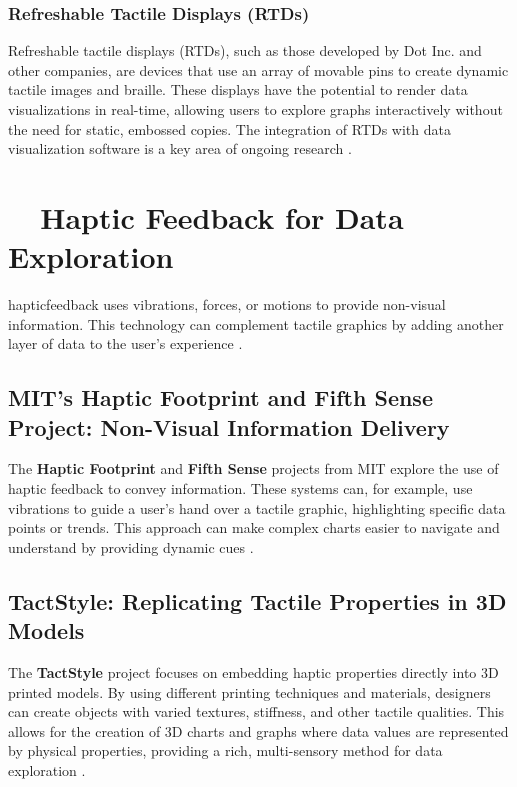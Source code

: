 \subsubsection{Refreshable Tactile Displays (RTDs)}\label{ch13:sssec:rtds}
Refreshable tactile displays (RTDs), such as those developed by Dot Inc. and other companies, are devices that use an array of movable pins to create dynamic tactile images and braille. These displays have the potential to render data visualizations in real-time, allowing users to explore graphs interactively without the need for static, embossed copies. The integration of RTDs with data visualization software is a key area of ongoing research \supercite{DotInc, OrbitGraphiti}.

\section{~~Haptic Feedback for Data Exploration}\label{ch13:sec:haptic-feedback}
\gls{hapticfeedback} uses vibrations, forces, or motions to provide non-visual information. This technology can complement tactile graphics by adding another layer of data to the user's experience \supercite{HapticDataViz}.

\subsection{MIT's Haptic Footprint and Fifth Sense Project: Non-Visual Information Delivery}\label{ch13:ssec:haptic-footprint}
The \textbf{Haptic Footprint} and \textbf{Fifth Sense} projects from MIT explore the use of haptic feedback to convey information. These systems can, for example, use vibrations to guide a user's hand over a tactile graphic, highlighting specific data points or trends. This approach can make complex charts easier to navigate and understand by providing dynamic cues \supercite{HapticFootprint, MITFifthSense}.

\subsection{TactStyle: Replicating Tactile Properties in 3D Models}\label{ch13:ssec:tactstyle}
The \textbf{TactStyle} project focuses on embedding haptic properties directly into 3D printed models. By using different printing techniques and materials, designers can create objects with varied textures, stiffness, and other tactile qualities. This allows for the creation of 3D charts and graphs where data values are represented by physical properties, providing a rich, multi-sensory method for data exploration \supercite{TactStyle}.

